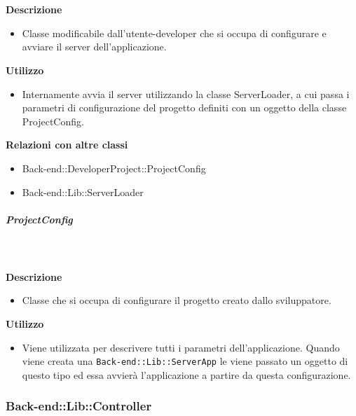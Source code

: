 				\textbf{\\ \\ Descrizione} 
					\begin{itemize}
						\item[] Classe modificabile dall'utente-developer che si occupa di configurare e avviare il server dell'applicazione.
					\end{itemize}      
				\textbf{Utilizzo}  
					\begin{itemize}
						\item[] Internamente avvia il server utilizzando la classe ServerLoader, a cui passa i parametri di configurazione del progetto definiti con un oggetto della classe ProjectConfig.
					\end{itemize}
					\textbf{Relazioni con altre classi}
					\begin{itemize}
							\item{Back-end::DeveloperProject::ProjectConfig}
							\item{Back-end::Lib::ServerLoader}
					\end{itemize}
			\subparagraph{ProjectConfig}
				
				\textbf{\\ \\ Descrizione} 
					\begin{itemize}
						\item[] Classe che si occupa di configurare il progetto creato dallo sviluppatore.
					\end{itemize}      
				\textbf{Utilizzo}  
					\begin{itemize}
						\item[] Viene utilizzata per descrivere tutti i parametri dell'applicazione. Quando viene creata una \texttt{Back-end::Lib::ServerApp} le viene passato un oggetto di questo tipo ed essa avvierà l'applicazione a partire da questa configurazione.
					\end{itemize}
	\subsubsection{Back-end::Lib::Controller}
